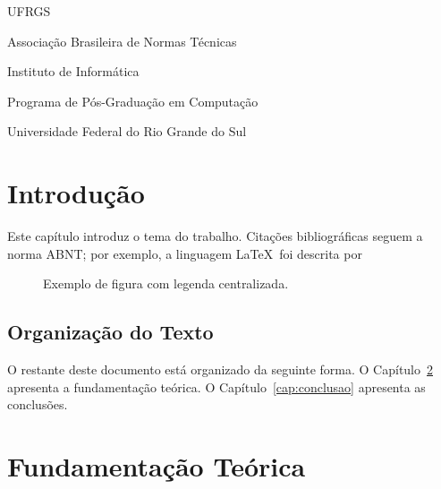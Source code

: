 \documentclass[ppgc,diss,english]{infufrgs}
\begin{document}
\listoffigures

\listoftables

\begin{listofabbrv}{UFRGS}
  \item[ABNT] Associação Brasileira de Normas Técnicas
  \item[INF]  Instituto de Informática
  \item[PPGC] Programa de Pós-Graduação em Computação
  \item[UFRGS] Universidade Federal do Rio Grande do Sul
\end{listofabbrv}



\chapter{Introdução}

Este capítulo introduz o tema do trabalho.  Citações bibliográficas seguem a
norma ABNT; por exemplo, a linguagem \LaTeX\ foi descrita por


\begin{figure}[htbp]
  \centering
  \fbox{\rule{0pt}{4cm}\rule{6cm}{0pt}}
  \caption{Exemplo de figura com legenda centralizada.}
  \label{fig:exemplo}
\end{figure}

\section{Organização do Texto}

O restante deste documento está organizado da seguinte forma.  O
Capítulo~\ref{cap:fundamentacao} apresenta a fundamentação teórica.
O Capítulo~\ref{cap:conclusao} apresenta as conclusões.

\chapter{Fundamentação Teórica}
\label{cap:fundamentacao}
\end{document}
